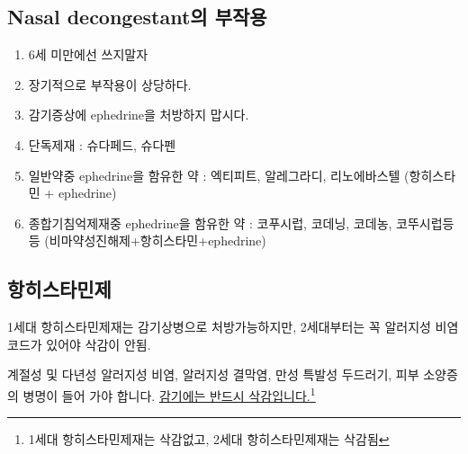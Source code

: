 \subsection{Nasal decongestant의 부작용}
\begin{enumerate}\tightlist
\item 6세 미만에선 쓰지말자
\item 장기적으로 부작용이 상당하다.
\item 감기증상에 ephedrine을 처방하지 맙시다.
\item 단독제재 : 슈다페드, 슈다펜
\item 일반약중 ephedrine을 함유한 약 : 엑티피트, 알레그라디, 리노에바스텔 (항히스타민 + ephedrine)
\item 종합기침억제재중 ephedrine을 함유한 약 : 코푸시럽, 코데닝, 코데농, 코뚜시럽등등 (비마약성진해제+항히스타민+ephedrine) 
\end{enumerate}


\subsection{항히스타민제}
1세대 항히스타민제재는 감기상병으로 처방가능하지만, 2세대부터는 꼭 알러지성 비염 코드가 있어야 삭감이 안됨. \par
계절성 및 다년성 알러지성 비염, 알러지성 결막염, 만성 특발성 두드러기, 피부 소양증의 병명이 들어 가야 합니다. \uline{감기에는 반드시 삭감입니다.\footnote{1세대 항히스타민제재는 삭감없고, 2세대 항히스타민제재는 삭감됨}}
\par
\medskip


